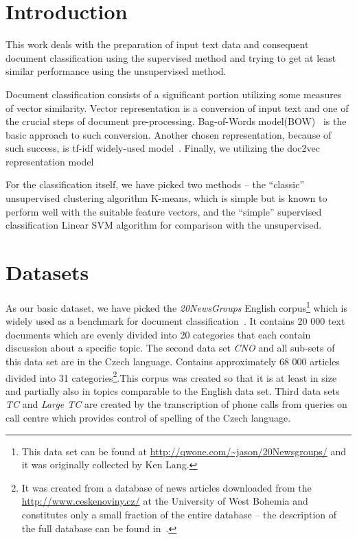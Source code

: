 \documentclass[runningheads,a4paper]{llncs}
\begin{document}
\section{Introduction}
\label{sec:intro}
This work deals with the preparation of input text data and consequent document classification using the supervised method and trying to get at least similar performance using the unsupervised method.

Document classification consists of a significant portion utilizing some measures of vector similarity. Vector representation is a conversion of input text and one of the crucial steps of document pre-processing. Bag-of-Words model(BOW)~\cite{bow1} is the basic approach to such conversion. Another chosen representation, because of such success, is tf-idf widely-used model~\cite{TWE,impruvDocClass,thesisJE,chinniyan2017semantic,jiang2018text}. Finally, we utilizing the doc2vec~\cite{lau2016empirical} representation model%

For the classification itself, we have picked two methods -- the ``classic'' unsupervised clustering algorithm K-means, which is simple but is known to perform well with the suitable feature vectors, and the ``simple'' supervised classification Linear SVM algorithm for comparison with the unsupervised. 


\section{Datasets}
\label{sec:data}
As our basic dataset, we have picked the \emph{20NewsGroups} English corpus\footnote{This data set can be found at \url{http://qwone.com/~jason/20Newsgroups/} and it was originally collected by Ken Lang.} which is widely used as a benchmark for document classification~\cite{chinniyan2017semantic,jiang2018text,TWE,WordRep,novotny2017unsupervised,refVysBinary,refVysEval}. It contains 20 000 text documents which are evenly divided into 20 categories that each contain discussion about a specific topic. The second data set \emph{CNO} and all sub-sets of this data set are in the Czech language. Contains approximately 68 000 articles divided into 31 categories\footnote{It was created from a database of news articles downloaded from the \url{http://www.ceskenoviny.cz/} at the University of West Bohemia and constitutes only a small fraction of the entire database -- the description of the full database can be found in~\cite{jmzw}.}.This corpus was created so that it is at least in size and partially also in topics comparable to the English data set. Third data sets \emph{TC} and \emph{Large TC} are created by the transcription of phone calls from queries on call centre which provides control of spelling of the Czech language. 
\end{document}
